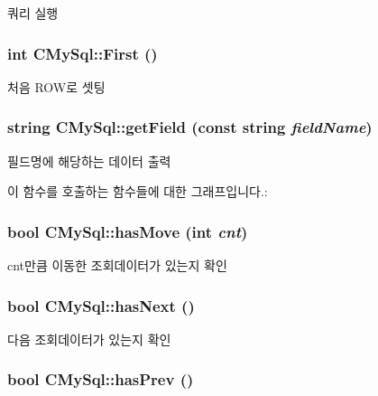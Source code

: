 쿼리 실행 \hypertarget{classCMySql_ab356f387b622ff7b977b720f66438d2a}{
\subsubsection[{First}]{\setlength{\rightskip}{0pt plus 5cm}int CMySql::First ()}}
\label{classCMySql_ab356f387b622ff7b977b720f66438d2a}


처음 ROW로 셋팅 \hypertarget{classCMySql_a47f9180acc8779dce03902cf3edcc598}{
\subsubsection[{getField}]{\setlength{\rightskip}{0pt plus 5cm}string CMySql::getField (const string {\em fieldName})}}
\label{classCMySql_a47f9180acc8779dce03902cf3edcc598}


필드명에 해당하는 데이터 출력 

이 함수를 호출하는 함수들에 대한 그래프입니다.:\hypertarget{classCMySql_a7748c82b0baa453b5cadf7ee209e3998}{
\subsubsection[{hasMove}]{\setlength{\rightskip}{0pt plus 5cm}bool CMySql::hasMove (int {\em cnt})}}
\label{classCMySql_a7748c82b0baa453b5cadf7ee209e3998}


cnt만큼 이동한 조회데이터가 있는지 확인 \hypertarget{classCMySql_a4d3029d73d2b9601a4bb800721c3974d}{
\subsubsection[{hasNext}]{\setlength{\rightskip}{0pt plus 5cm}bool CMySql::hasNext ()}}
\label{classCMySql_a4d3029d73d2b9601a4bb800721c3974d}


다음 조회데이터가 있는지 확인 \hypertarget{classCMySql_af7eb82330c5e96fd76d740654639aa40}{
\subsubsection[{hasPrev}]{\setlength{\rightskip}{0pt plus 5cm}bool CMySql::hasPrev ()}}
\label{classCMySql_af7eb82330c5e96fd76d740654639aa40}


